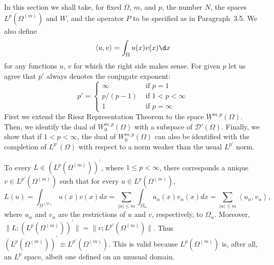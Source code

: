 \begin{para}
  In this section we shall take, for fixed $\Omega$, $m$, and $p$, the number $N$,
  the spaces $L^p(\Omega^{(m)})$ and $W$, and the operator $P$ to be specified as in 
  Paragraph~3.5. We also define
  \[
  \langle u, v\rangle = \int_{\Omega} u(x) v(x) \d x
  \]
  for any functions $u$, $v$ for which the right side makes sense.
  For given $p$ let us agree that $p'$ always denotes the conjugate exponent:
  \[
  p' = 
    \begin{cases}
      \infty & \text { if } p=1 \\
      p /(p-1) & \text { if } 1<p<\infty \\
      1 & \text { if } p=\infty
    \end{cases}
  \]
  First we extend the Riesz Representation Theorem to the space $W^{m, p}(\Omega)$.
  Then, we identify the dual of $W_0^{m, p}(\Omega)$ with a subspace of $\mathscr{D}'(\Omega)$. 
  Finally, we show that if $1<p<\infty$, the dual of $W_0^{m, p}(\Omega)$ can also be identified 
  with the completion of $L^{p'}(\Omega)$ with respect to a norm weaker than the
  usual $L^{p'}$ norm.
\end{para}


\begin{para}
  To every $L\in\left(L^p(\Omega^{(m)})\right)^{\prime}$, where $1 \leq p<\infty$, 
  there corresponds a unique $v \in L^{p'}(\Omega^{(m)})$ such that for every 
  $u \in L^p(\Omega^{(m)})$,
  \[
   L(u)=\int_{\Omega^{(m)}} u(x) v(x) d x=\sum_{|\alpha| \leq m} \int_{\Omega_\alpha} u_\alpha(x)v_\alpha(x) d x=\sum_{|\alpha| \leq m}\left\langle u_\alpha, v_\alpha\right\rangle,
  \]
  where $u_\alpha$ and $v_\alpha$ are the restrictions of $u$ and $v$, respectively, to $\Omega_\alpha$.
  Moreover, $\bigl\|L ;\left(L^p(\Omega^{(m)})\right)^{\prime}\bigr\|
    = \bigl\|v ; L^{p'}(\Omega^{(m)})\bigr\|$.
  Thus $\left(L^p(\Omega^{(m)})\right)^{\prime} \equiv L^{p'}(\Omega^{(m)})$.
  This is valid because $L^p(\Omega^{(m)})$ is,
  after all, an $L^p$ space, albeit one defined on an unusual domain.
\end{para}

